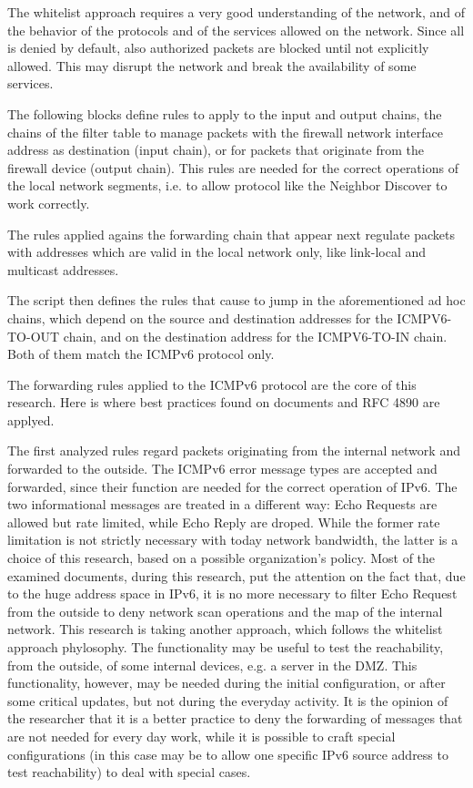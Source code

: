 \documentclass[12pt]{article}
\begin{document}
The whitelist approach requires a very good understanding of the network, and of the behavior of the protocols and of the services allowed on the network. Since all is denied by default, also authorized packets are blocked until not explicitly allowed. This may disrupt the network and break the availability of some services.

The following blocks define rules to apply to the input and output chains, the chains of the filter table to manage packets with the firewall network interface address as destination (input chain), or for packets that originate from the firewall device (output chain). This rules are needed for the correct operations of the local network segments, i.e. to allow protocol like the Neighbor Discover to work correctly.

The rules applied agains the forwarding chain that appear next regulate packets with addresses which are valid in the local network only, like link-local and multicast addresses.

The script then defines the rules that cause to jump in the aforementioned ad hoc chains, which depend on the source and destination addresses for the ICMPV6-TO-OUT chain, and on the destination address for the ICMPV6-TO-IN chain. Both of them match the ICMPv6 protocol only.

The forwarding rules applied to the ICMPv6 protocol are the core of this research. Here is where best practices found on documents and RFC 4890 are applyed.

The first analyzed rules regard packets originating from the internal network and forwarded to the outside. The ICMPv6 error message types are accepted and forwarded, since their function are needed for the correct operation of IPv6. The two informational messages are treated in a different way: Echo Requests are allowed but rate limited, while Echo Reply are droped. While the former rate limitation is not strictly necessary with today network bandwidth, the latter is a choice of this research, based on a possible organization's policy. Most of the examined documents, during this research, put the attention on the fact that, due to the huge address space in IPv6, it is no more necessary to filter Echo Request from the outside to deny network scan operations and the map of the internal network. This research is taking another approach, which follows the whitelist approach phylosophy. The functionality may be useful to test the reachability, from the outside, of some internal devices, e.g. a server in the DMZ. This functionality, however, may be needed during the initial configuration, or after some critical updates, but not during the everyday activity. It is the opinion of the researcher that it is a better practice to deny the forwarding of messages that are not needed for every day work, while it is possible to craft special configurations (in this case may be to allow one specific IPv6 source address to test reachability) to deal with special cases.
\end{document}
